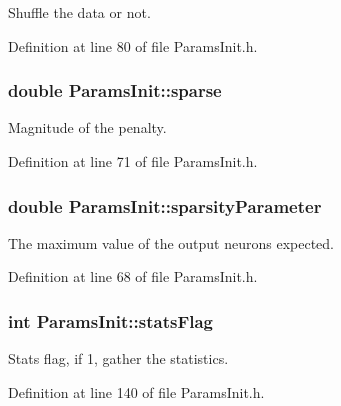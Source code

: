 Shuffle the data or not. 



Definition at line 80 of file Params\+Init.\+h.

\subsubsection[{\texorpdfstring{sparse}{sparse}}]{\setlength{\rightskip}{0pt plus 5cm}double Params\+Init\+::sparse}\hypertarget{classParamsInit_ab65c93afa1f704b359b25f90f81c1edc}{}\label{classParamsInit_ab65c93afa1f704b359b25f90f81c1edc}


Magnitude of the penalty. 



Definition at line 71 of file Params\+Init.\+h.

\subsubsection[{\texorpdfstring{sparsity\+Parameter}{sparsityParameter}}]{\setlength{\rightskip}{0pt plus 5cm}double Params\+Init\+::sparsity\+Parameter}\hypertarget{classParamsInit_aa065f164bd6831a5cc6ecb0ee5234466}{}\label{classParamsInit_aa065f164bd6831a5cc6ecb0ee5234466}


The maximum value of the output neurons expected. 



Definition at line 68 of file Params\+Init.\+h.

\subsubsection[{\texorpdfstring{stats\+Flag}{statsFlag}}]{\setlength{\rightskip}{0pt plus 5cm}int Params\+Init\+::stats\+Flag}\hypertarget{classParamsInit_aebf6eb0407471bda84bcb1a3c4a0ea12}{}\label{classParamsInit_aebf6eb0407471bda84bcb1a3c4a0ea12}


Stats flag, if 1, gather the statistics. 



Definition at line 140 of file Params\+Init.\+h.

